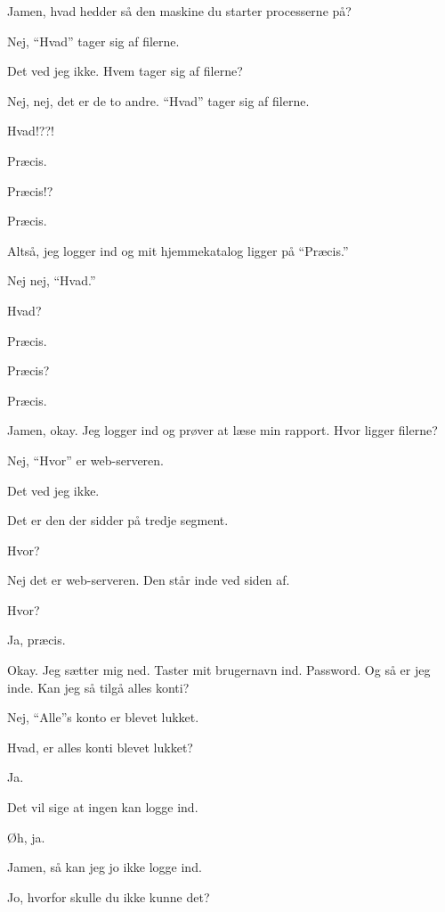 \documentclass[10pt]{article}
\begin{document}
\begin{sketch}
 Jamen, hvad hedder så den maskine du starter processerne på?

 Nej, ``Hvad'' tager sig af filerne.

 Det ved jeg ikke. Hvem tager sig af filerne?

 Nej, nej, det er de to andre. ``Hvad'' tager sig af filerne.

 Hvad!??!

 Præcis.

 Præcis!?

 Præcis.

 Altså, jeg logger ind og mit hjemmekatalog ligger på ``Præcis.''

 Nej nej, ``Hvad.''

 Hvad?

 Præcis.

 Præcis?

 Præcis.

 Jamen, okay. Jeg logger ind og prøver at læse min rapport. Hvor 
          ligger  filerne?

 Nej, ``Hvor'' er web-serveren.

 Det ved jeg ikke.

 Det er den der sidder på tredje segment.

 Hvor?

 Nej det er web-serveren. Den står inde ved siden af.

 Hvor?

 Ja, præcis.


 Okay. Jeg sætter mig ned. Taster mit brugernavn ind. Password. 
          Og så er jeg inde. Kan jeg så tilgå alles konti?

 Nej, ``Alle''s konto er blevet lukket.

 Hvad, er alles konti blevet lukket?

 Ja.

 Det vil sige at ingen kan logge ind.

 Øh, ja.

 Jamen, så kan jeg jo ikke logge ind.

 Jo, hvorfor skulle du ikke kunne det?


\end{sketch}
\end{document}
